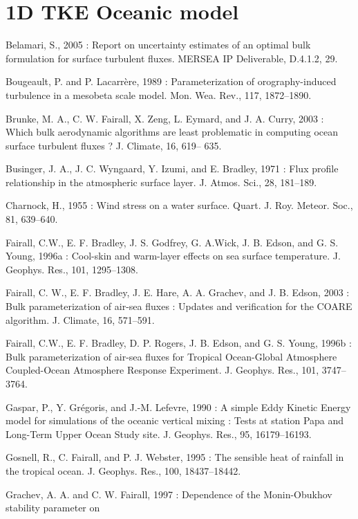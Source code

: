 \section{1D TKE Oceanic model}
\begin{description}

\item
Belamari, S., 2005 : Report on uncertainty estimates of an optimal bulk formulation for surface turbulent
fluxes. MERSEA IP Deliverable, D.4.1.2, 29.
\item
Bougeault, P. and P. Lacarr\`ere, 1989 : Parameterization of orography-induced turbulence in a mesobeta
scale model. Mon. Wea. Rev., 117, 1872–1890.
\item
Brunke, M. A., C. W. Fairall, X. Zeng, L. Eymard, and J. A. Curry, 2003 : Which bulk aerodynamic
algorithms are least problematic in computing ocean surface turbulent fluxes ? J. Climate, 16, 619–
635.
\item
Businger, J. A., J. C. Wyngaard, Y. Izumi, and E. Bradley, 1971 : Flux profile relationship in the
atmospheric surface layer. J. Atmos. Sci., 28, 181–189.
\item
Charnock, H., 1955 : Wind stress on a water surface. Quart. J. Roy. Meteor. Soc., 81, 639–640.
\item
Fairall, C.W., E. F. Bradley, J. S. Godfrey, G. A.Wick, J. B. Edson, and G. S. Young, 1996a : Cool-skin
and warm-layer effects on sea surface temperature. J. Geophys. Res., 101, 1295–1308.
\item
Fairall, C. W., E. F. Bradley, J. E. Hare, A. A. Grachev, and J. B. Edson, 2003 : Bulk parameterization
of air-sea fluxes : Updates and verification for the COARE algorithm. J. Climate, 16, 571–591.
\item
Fairall, C.W., E. F. Bradley, D. P. Rogers, J. B. Edson, and G. S. Young, 1996b : Bulk parameterization
of air-sea fluxes for Tropical Ocean-Global Atmosphere Coupled-Ocean Atmosphere Response
Experiment. J. Geophys. Res., 101, 3747–3764.
\item
Gaspar, P., Y. Gr\'egoris, and J.-M. Lefevre, 1990 : A simple Eddy Kinetic Energy model for simulations
of the oceanic vertical mixing : Tests at station Papa and Long-Term Upper Ocean Study site. J.
Geophys. Res., 95, 16179–16193.
\item
Gosnell, R., C. Fairall, and P. J. Webster, 1995 : The sensible heat of rainfall in the tropical ocean. J.
Geophys. Res., 100, 18437–18442.
\item
Grachev, A. A. and C. W. Fairall, 1997 : Dependence of the Monin-Obukhov stability parameter on

\end{description}
